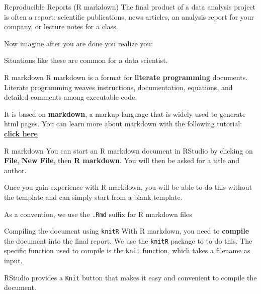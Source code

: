 \documentclass[
  ignorenonframetext,
  aspectratio=169]{beamer}
\providecommand{\tightlist}{%
  \setlength{\itemsep}{0pt}\setlength{\parskip}{0pt}}
\begin{document}
\begin{frame}{Reproducible Reports (R markdown)}
\label{reproducible-reports-r-markdown}
The final product of a data analysis project is often a report:
scientific publications, news articles, an analysis report for your
company, or lecture notes for a class.

Now imagine after you are done you realize you:


Situations like these are common for a data scientist.
\end{frame}

\begin{frame}{R markdown}
\label{r-markdown}
R markdown is a format for \textbf{literate programming} documents.
Literate programming weaves instructions, documentation, equations, and
detailed comments among executable code.

It is based on \textbf{markdown}, a markup language that is widely used
to generate html pages. You can learn more about markdown with the
following tutorial:
\href{https://www.markdowntutorial.com/}{\textbf{click here}}
\end{frame}

\begin{frame}[fragile]{R markdown}
\label{r-markdown-1}
You can start an R markdown document in RStudio by clicking on
\textbf{File}, \textbf{New File}, then \textbf{R markdown}. You will
then be asked for a title and author.

Once you gain experience with R markdown, you will be able to do this
without the template and can simply start from a blank template.

As a convention, we use the \texttt{.Rmd} suffix for R markdown files
\end{frame}

\begin{frame}[fragile]{Compiling the document using \texttt{knitR}}
\label{compiling-the-document-using-knitr}
With R markdown, you need to \textbf{compile} the document into the
final report. We use the \texttt{knitR} package to to do this. The
specific function used to compile is the \texttt{knit} function, which
takes a filename as input.

RStudio provides a \texttt{Knit} button that makes it easy and
convenient to compile the document.
\end{frame}
\end{document}
